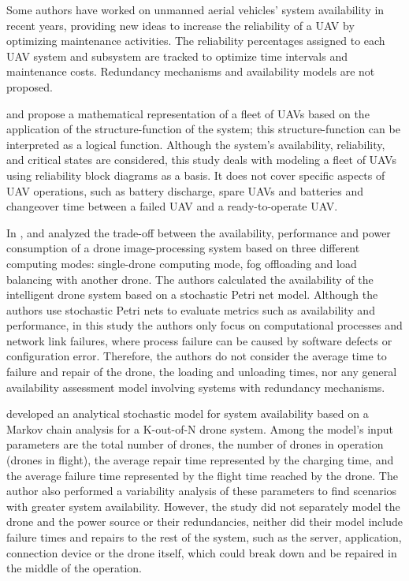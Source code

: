 \documentclass[conference]{IEEEtran}
\begin{document}
Some authors have worked on unmanned aerial vehicles’ system availability in recent years, \citet{Petritoli2017, Petritoli2018} providing new ideas to increase the reliability of a UAV by optimizing maintenance activities. The reliability percentages assigned to each UAV system and subsystem are tracked to optimize time intervals and maintenance costs. Redundancy mechanisms and availability models are not proposed.

\citet{Zaitseva2020} and \citet{rusnak2019reliability} propose a mathematical representation of a fleet of UAVs based on the application of the structure-function of the system; this structure-function can be interpreted as a logical function. Although the system’s availability, reliability, and critical states are considered, this study deals with modeling a fleet of UAVs using reliability block diagrams as a basis. It does not cover specific aspects of UAV operations, such as battery discharge, spare UAVs and batteries and changeover time between a failed UAV and a ready-to-operate UAV.

In \citet{Machida2021}, and \citet{Report} analyzed the trade-off between the availability, performance and power consumption of a drone image-processing system based on three different computing modes: single-drone computing mode, fog offloading and load balancing with another drone. The authors calculated the availability of the intelligent drone system based on a stochastic Petri net model. Although the authors use stochastic Petri nets to evaluate metrics such as availability and performance, in this study the authors only focus on computational processes and network link failures, where process failure can be caused by software defects or configuration error. Therefore, the authors do not consider the average time to failure and repair of the drone, the loading and unloading times, nor any general availability assessment model involving systems with redundancy mechanisms.

\citet{Maccarthy2019} developed an analytical stochastic model for system availability based on a Markov chain analysis for a K-out-of-N drone system. Among the model’s input parameters are the total number of drones, the number of drones in operation (drones in flight), the average repair time represented by the charging time, and the average failure time represented by the flight time reached by the drone. The author also performed a variability analysis of these parameters to find scenarios with greater system availability. However, the study did not separately model the drone and the power source or their redundancies, neither did their model include failure times and repairs to the rest of the system, such as the server, application, connection device or the drone itself, which could break down and be repaired in the middle of the operation.
\end{document}
